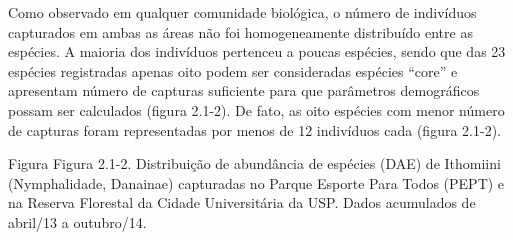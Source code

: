 Como observado em qualquer comunidade biológica, o número de indivíduos capturados em ambas as áreas não foi homogeneamente distribuído entre as espécies. A maioria dos indivíduos pertenceu a poucas espécies, sendo que das 23 espécies registradas apenas oito podem ser consideradas espécies “core” e apresentam número de capturas suficiente para que parâmetros demográficos possam ser calculados (figura 2.1-2). De fato, as oito espécies com menor número de capturas foram representadas por menos de 12 indivíduos cada (figura 2.1-2).

Figura
Figura 2.1-2. Distribuição de abundância de espécies (DAE) de Ithomiini (Nymphalidade, Danainae) capturadas no Parque Esporte Para Todos (PEPT) e na Reserva Florestal da Cidade Universitária da USP. Dados acumulados de abril/13 a outubro/14.








